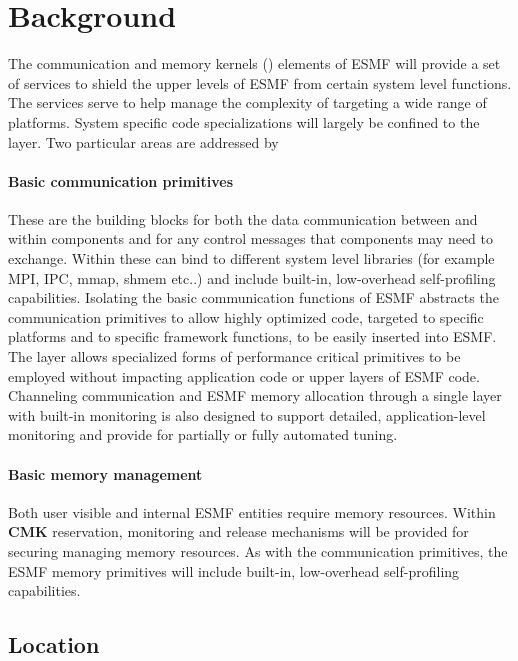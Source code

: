 
\section{Background}

The communication and memory kernels ({\bf \shortname}) elements of ESMF 
will provide a set of services to shield the upper levels of ESMF from certain
system level functions. The {\bf \shortname} services serve to help
manage the complexity of targeting a wide range of platforms.
System specific code specializations will largely be confined 
to the {\bf \shortname} layer.
Two particular areas are addressed by {\bf \shortname}

\paragraph {\bf Basic communication primitives} These are the building blocks for 
both the data communication between and within components and for any
control messages that components may need to exchange. Within {\bf
  \shortname} these can bind to different system level libraries (for
example MPI, IPC, mmap, shmem etc..) and include built-in,
low-overhead self-profiling capabilities.  Isolating the basic
communication functions of ESMF abstracts the communication primitives
to allow highly optimized code, targeted to specific platforms and to
specific framework functions, to be easily inserted into ESMF. The
{\bf \shortname} layer allows specialized forms of performance
critical primitives to be employed without impacting application code
or upper layers of ESMF code.  Channeling communication and ESMF
memory allocation through a single layer with built-in monitoring is
also designed to support detailed, application-level monitoring and
provide for partially or fully automated tuning.


\paragraph {\bf Basic memory management} Both user visible and internal
ESMF entities require memory resources. Within {\bf CMK} reservation,
 monitoring and release mechanisms will be provided for securing managing
memory resources. As with the communication primitives, the
ESMF memory primitives will include built-in, low-overhead self-profiling 
capabilities.


\subsection{Location}

